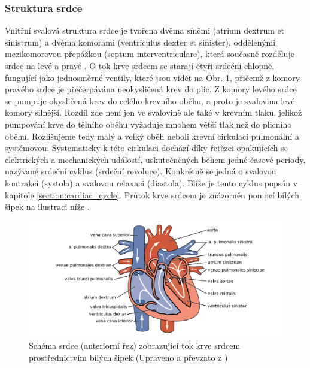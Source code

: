 \subsubsection{Struktura srdce}
\label{section:heart_structure}
Vnitřní svalová struktura srdce je tvořena dvěma síněmi (atrium dextrum et
sinistrum) a dvěma komorami (ventriculus dexter et sinister), oddělenými
mezikomorovou přepážkou (septum interventriculare), která současně rozděluje
srdce na levé a pravé \cite{Memorix2017}. O tok krve srdcem se starají čtyři
srdeční chlopně, fungující jako jednosměrné ventily, které jsou vidět na Obr.
\ref{fig:heartanatomy}, přičemž z komory pravého srdce je přečerpávána
neokysličená krev do plic. Z komory levého srdce se pumpuje okysličená krev do
celého krevního oběhu, a proto je svalovina levé komory silnější. Rozdíl zde
není jen ve svalovině ale také v krevním tlaku, jelikož pumpování krve do
tělního oběhu vyžaduje mnohem větší tlak než do plicního oběhu. Rozlišujeme tedy
malý a velký oběh neboli krevní cirkulaci pulmonální a systémovou. Systematicky
k této cirkulaci dochází díky řetězci opakujících se elektrických a mechanických
událostí, uskutečněných během jedné časové periody, nazývané srdeční cyklus
(srdeční revoluce). Konkrétně se jedná o svalovou kontrakci (systola) a svalovou
relaxaci (diastola). Blíže je tento cyklus popsán v kapitole
\ref{section:cardiac_cycle}. Průtok krve srdcem je znázorněn pomocí bílých šipek
na ilustraci níže \cite{Stejfa2006}.

\begin{figure}[h]
	\begin{center}
		\includegraphics[width=1\textwidth]{../assets/anatomy/heart}
		\caption{Schéma srdce (anteriorní řez) zobrazující tok krve srdcem
			prostřednictvím bílých šipek (Upraveno a převzato z
			\cite{OpenStax})}
		\label{fig:heartanatomy}
	\end{center}
\end{figure}


